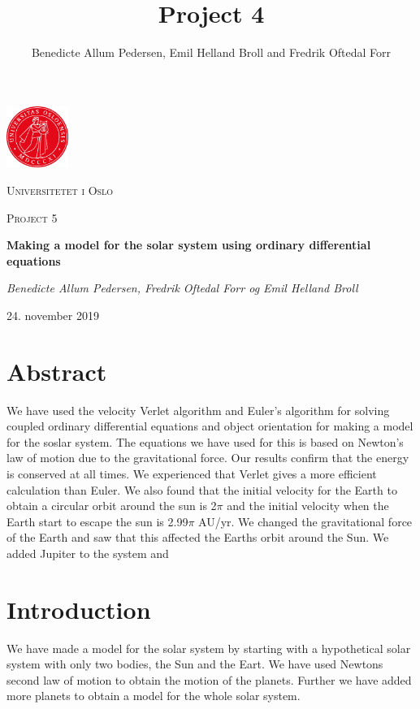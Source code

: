 \documentclass{article}
\title{Project 4}\vspace{-3ex}
\author{Benedicte Allum Pedersen, Emil Helland Broll and Fredrik Oftedal Forr}
\date{\vspace{-5ex}}
\begin{document}
\begin{titlepage}
  \centering
  \includegraphics[width=0.15\textwidth]{./pics/uio.png}\par\vspace{1cm}
  {\scshape\LARGE Universitetet i Oslo\par}
  \vspace{1cm}
  {\scshape\Large Project 5\par}
  \vspace{1.5cm}
  {\huge\bfseries Making a model for the solar system using ordinary differential equations\par}
  \vspace{2cm}
  {\Large\itshape Benedicte Allum Pedersen, Fredrik Oftedal Forr og Emil Helland Broll\par}
	\vfill

  \vfill
  {\large 24. november 2019\par}
\end{titlepage}

\section*{Abstract}
We have used the velocity Verlet algorithm and Euler's algorithm for solving coupled ordinary differential equations and object orientation for making a model for the soslar system. The equations we have used for this is based on Newton's law of motion due to the gravitational force. Our results confirm that the energy is conserved at all times. We experienced that Verlet gives a more efficient calculation than Euler. We also found that the initial velocity for the Earth to obtain a circular orbit around the sun is 2$\pi$ and the initial velocity when the Earth start to escape the sun is 2.99$\pi$ AU/yr. We changed the gravitational force of the Earth and saw that this affected the Earths orbit around the Sun. We added Jupiter to the system and 

\tableofcontents

\newpage

\section{Introduction}
We have made a model for the solar system by starting with a hypothetical solar system with only two bodies, the Sun and the Eart. We have used Newtons second law of motion to obtain the motion of the planets. Further we have added more planets to obtain a model for the whole solar system.
\end{document}

